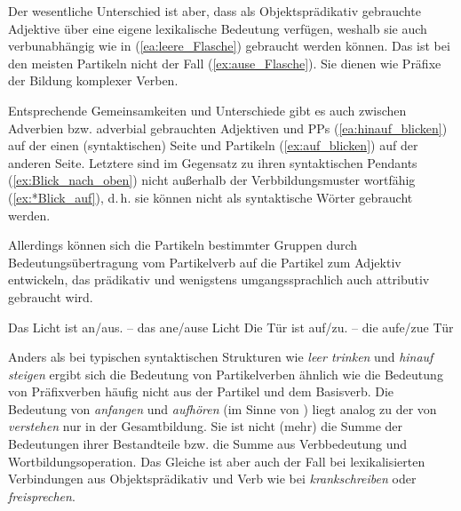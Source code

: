Der wesentliche Unterschied ist aber, dass als Objektsprädikativ gebrauchte Adjektive über eine eigene lexikalische Bedeutung verfügen, weshalb sie auch verbunabhängig wie in (\ref{ea:leere_Flasche}) gebraucht werden können. Das ist bei den meisten Partikeln nicht der Fall (\ref{ex:ause_Flasche}). Sie dienen wie Präfixe der Bildung komplexer Verben.

\ea \label{ea:OP_VPart2}
\label{ea:leere_Flasche}
\label{ex:ause_Flasche}
\z
\z 

Entsprechende Gemeinsamkeiten und Unterschiede gibt es auch zwischen Adverbien bzw. adverbial gebrauchten Adjektiven und PPs (\ref{ea:hinauf_blicken}) auf der einen (syntaktischen) Seite und Partikeln (\ref{ex:auf_blicken}) auf der anderen Seite. Letztere sind im Gegensatz zu ihren syntaktischen Pendants (\ref{ex:Blick_nach_oben}) nicht außerhalb der Verbbildungsmuster wortfähig (\ref{ex:*Blick_auf}), d.\,h. sie können nicht als syntaktische Wörter gebraucht werden. 

\ea \label{ea:Adv_VPart}
\label{ea:hinauf_blicken}
\label{ex:auf_blicken}
\label{ex:Blick_nach_oben}
\label{ex:*Blick_auf}
\z 
\z 

Allerdings können sich die Partikeln bestimmter Gruppen durch Bedeutungsübertragung vom Partikelverb auf die Partikel zum Adjektiv entwickeln, das prädikativ und wenigstens umgangssprachlich auch attributiv gebraucht wird.

\ea \label{ea:Part_zu_Adj}
\ea \label{ea:an_aus_sein} Das Licht ist an/aus. -- das ane/ause Licht
\ex \label{ex:auf_zu_sein} Die Tür ist auf/zu. -- die aufe/zue Tür
\z 
\z 

Anders als bei typischen syntaktischen Strukturen wie \textit{leer trinken} und \textit{hinauf steigen} ergibt sich die Bedeutung von Partikelverben ähnlich wie die Bedeutung von Präfixverben häufig nicht aus der Partikel und dem Basisverb. Die Bedeutung von \textit{anfangen} und \textit{aufhören} (im Sinne von ) liegt analog zu der von \textit{verstehen} nur in der Gesamtbildung. Sie ist nicht (mehr) die Summe der Bedeutungen ihrer Bestandteile bzw. die Summe aus Verbbedeutung und Wortbildungsoperation. Das Gleiche ist aber auch der Fall bei lexikalisierten Verbindungen aus Objektsprädikativ und Verb wie bei \textit{krankschreiben} oder \textit{freisprechen}.


